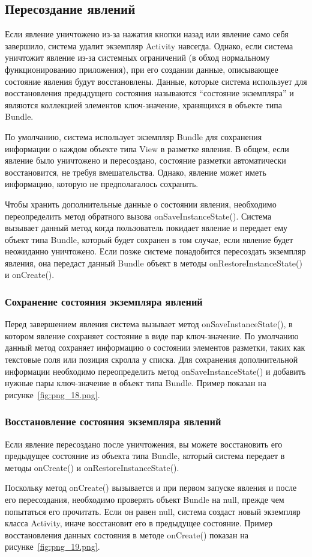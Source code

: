 \subsection{Пересоздание явлений}
Если явление уничтожено из-за нажатия кнопки назад или явление само себя
завершило, система удалит экземпляр Activity навсегда. Однако, если
система уничтожит явление из-за системных ограничений (в обход
нормальному функционированию приложения), при его создании данные,
описывающее состояние явления будут восстановлены. Данные, которые
система использует для восстановления предыдущего состояния называются
“состояние экземпляра” и являются коллекцией элементов ключ-значение,
хранящихся в объекте типа Bundle.\par
По умолчанию, система использует экземпляр Bundle для сохранения
информации о каждом объекте типа View в разметке явления. В общем, если
явление было уничтожено и пересоздано, состояние разметки
автоматически восстановится, не требуя вмешательства. Однако,
явление может иметь информацию, которую не предполагалось сохранять.\par
Чтобы хранить дополнительные данные о состоянии явления, необходимо
переопределить метод обратного вызова onSaveInstanceState(). Система
вызывает данный метод когда пользователь покидает явление и передает ему
объект типа Bundle, который будет сохранен в том случае, если явление
будет неожиданно уничтожено. Если позже системе понадобится пересоздать
экземпляр явления, она передаст данный Bundle объект в методы
onRestoreInstanceState() и onCreate().

\subsubsection{Сохранение состояния экземпляра явлений}
Перед завершением явления система вызывает метод onSaveInstanceState(), в
котором явление сохраняет состояние в виде пар ключ-значение. По
умолчанию данный метод сохраняет информацию о состоянии элементов
разметки, таких как текстовые поля или позиция скролла у списка.
Для сохранения дополнительной информации необходимо переопределить
метод onSaveInstanceState() и добавить нужные пары ключ-значение в объект
типа Bundle. Пример показан на рисунке~\ref{fig:png_18.png}.

\subsubsection{Восстановление состояния экземпляра явлений}
Если явление пересоздано после уничтожения, вы можете восстановить его
предыдущее состояние из объекта типа Bundle, который система передает в
методы onCreate() и onRestoreInstanceState().\par
Поскольку метод onCreate() вызывается и при первом запуске явления и
после его пересоздания, необходимо проверять объект Bundle на null, прежде
чем попытаться его прочитать. Если он равен null, система создаст новый
экземпляр класса Activity, иначе восстановит его в предыдущее состояние.
Пример восстановления данных состояния в методе onCreate() показан
на рисунке~\ref{fig:png_19.png}.


